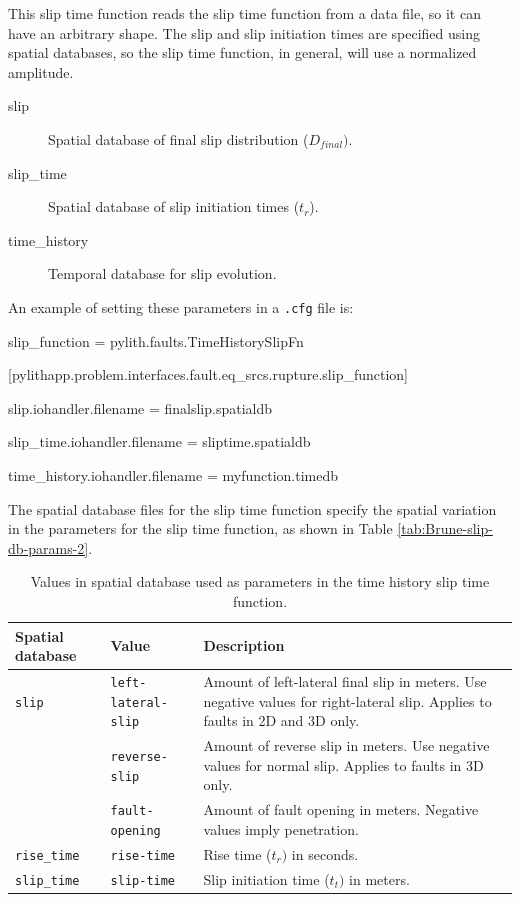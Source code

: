 This slip time function reads the slip time function from a data file,
so it can have an arbitrary shape. The slip and slip initiation times
are specified using spatial databases, so the slip time function,
in general, will use a normalized amplitude.
\begin{description}
\item [{slip}] Spatial database of final slip distribution ($D_{final})$.
\item [{slip\_time}] Spatial database of slip initiation times ($t_{r}$).
\item [{time\_history}] Temporal database for slip evolution.
\end{description}
An example of setting these parameters in a \texttt{.cfg} file is:
\begin{lyxcode}

slip\_function = pylith.faults.TimeHistorySlipFn 

[pylithapp.problem.interfaces.fault.eq\_srcs.rupture.slip\_function]

slip.iohandler.filename = finalslip.spatialdb

slip\_time.iohandler.filename = sliptime.spatialdb

time\_history.iohandler.filename = myfunction.timedb
\end{lyxcode}
The spatial database files for the slip time function specify the
spatial variation in the parameters for the slip time function, as
shown in Table \vref{tab:Brune-slip-db-params-2}.

\begin{table}[htbp]
\caption{Values in spatial database used
as parameters in the time history slip time function.}
\label{tab:Brune-slip-db-params-2}
\begin{tabular}{llp{2.5in}}
\textbf{Spatial database} & \textbf{Value} & \textbf{Description}\\
\hline 
\texttt{slip} & \texttt{left-lateral-slip} & Amount of left-lateral final slip in meters. Use negative values for
right-lateral slip. Applies to faults in 2D and 3D only.\\
 & \texttt{reverse-slip} & Amount of reverse slip in meters. Use negative values for normal slip.
Applies to faults in 3D only.\\
 & \texttt{fault-opening} & Amount of fault opening in meters. Negative values imply penetration.\\
\hline 
\texttt{rise\_time} & \texttt{rise-time} & Rise time ($t_{r})$ in seconds.\\
\hline 
\texttt{slip\_time} & \texttt{slip-time} & Slip initiation time ($t_{t})$ in meters.\\
\hline 
\end{tabular}
\end{table}


